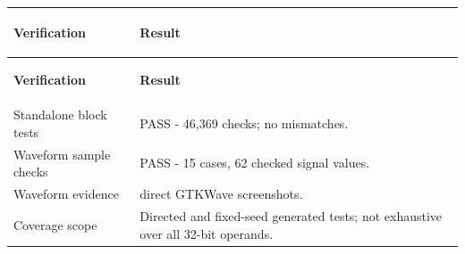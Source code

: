 \documentclass[11pt,a4paper]{article}
\newlength{\ReportTableWidth}
\begin{document}
{\small\setlength{\tabcolsep}{4pt}\setlength{\ReportTableWidth}{\linewidth}
\noindent\begin{longtable}{|>{\raggedright\arraybackslash}p{\dimexpr 0.38\ReportTableWidth-2\tabcolsep-2\arrayrulewidth\relax}|>{\raggedright\arraybackslash}p{\dimexpr 0.62\ReportTableWidth-2\tabcolsep-2\arrayrulewidth\relax}|}
\hline
\colorbox{tablegray}{\parbox[t]{\dimexpr 0.38\ReportTableWidth-2\tabcolsep-2\arrayrulewidth-2\fboxsep\relax}{\strut\textbf{Verification}\strut}} & \colorbox{tablegray}{\parbox[t]{\dimexpr 0.62\ReportTableWidth-2\tabcolsep-2\arrayrulewidth-2\fboxsep\relax}{\strut\textbf{Result}\strut}} \\ \hline
\endfirsthead
\hline
\colorbox{tablegray}{\parbox[t]{\dimexpr 0.38\ReportTableWidth-2\tabcolsep-2\arrayrulewidth-2\fboxsep\relax}{\strut\textbf{Verification}\strut}} & \colorbox{tablegray}{\parbox[t]{\dimexpr 0.62\ReportTableWidth-2\tabcolsep-2\arrayrulewidth-2\fboxsep\relax}{\strut\textbf{Result}\strut}} \\ \hline
\endhead
Standalone block tests & PASS - 46,\allowbreak{}369 checks; no mismatches. \\ \hline
Waveform sample checks & PASS - 15 cases,\allowbreak{} 62 checked signal values. \\ \hline
Waveform evidence & 33 direct GTKWave screenshots. \\ \hline
Coverage scope & Directed and fixed-seed generated tests; not exhaustive over all 32-bit operands. \\ \hline
\end{longtable}
}
\end{document}
